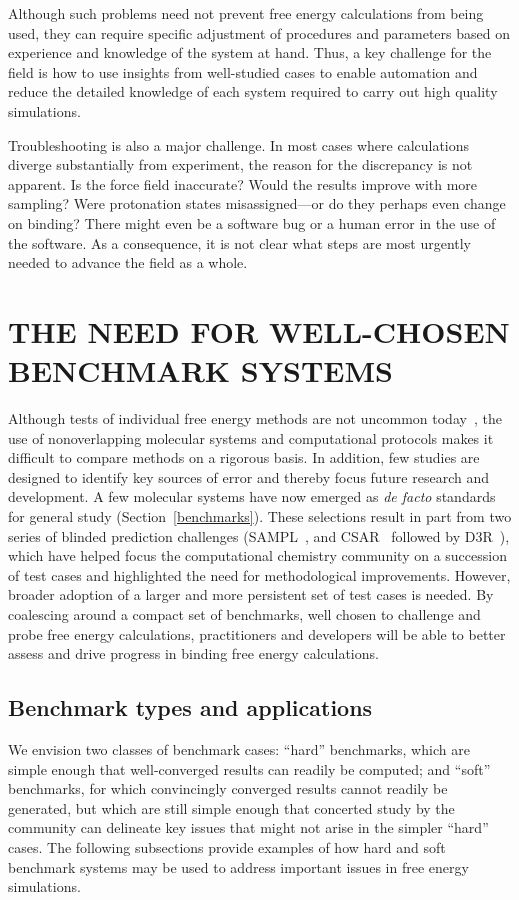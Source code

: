 \documentclass[aps,pre,twocolumn,nofootinbib,superscriptaddress,10pt, final,tightenlines]{revtex4-1}
\begin{document}
Although such problems need not prevent free energy calculations from being used, they can require specific adjustment of procedures and parameters based on experience and knowledge of the system at hand.  
Thus, a key challenge for the field is how to use insights from well-studied cases to enable automation and reduce the detailed knowledge of each system required to carry out high quality simulations. 

Troubleshooting is also a major challenge. 
In most cases where calculations diverge substantially from experiment, the reason for the discrepancy is not apparent. 
Is the force field inaccurate? 
Would the results improve with more sampling?  Were protonation states misassigned---or do they perhaps even change on binding? 
There might even be a software bug \cite{eklund_cluster_2016} or a human error in the use of the software. 
As a consequence, it is not clear what steps are most urgently needed to advance the field as a whole.


\section{THE NEED FOR WELL-CHOSEN BENCHMARK SYSTEMS}

Although tests of individual free energy methods are not uncommon today~\cite{mikulskis_large-scale_2014, schrodinger_accurate_2015, christ_binding_2016, cui_affinity_2016, verras_free_2016}, the use of nonoverlapping molecular systems and computational protocols makes it difficult to compare methods on a rigorous basis.
In addition, few studies are designed to identify key sources of error and thereby focus future research and development.
A few molecular systems have now emerged as \emph{de facto} standards for general study (Section~\ref{benchmarks}). 
These selections result in part from two series of blinded prediction challenges (SAMPL~\cite{muddana_sampl4_2014}, and CSAR~\cite{dunbar_csar_2011} followed by D3R~\cite{gathiaka_d3r_2016}), which have helped focus the computational chemistry community on a succession of test cases and highlighted the need for methodological improvements. 
However, broader adoption of a larger and more persistent set of test cases is needed. 
By coalescing around a compact set of benchmarks, well chosen to challenge and probe free energy calculations, practitioners and developers will be able to better assess and drive progress in binding free energy calculations. 


\subsection{Benchmark types and applications}
\label{subsec:benchmarktypes}
We envision two classes of benchmark cases: ``hard'' benchmarks, which are simple enough that well-converged results can readily be computed; and ``soft'' benchmarks, for which convincingly converged results cannot readily be generated, but which are still simple enough that concerted study by the community can delineate key issues that might not arise in the simpler ``hard'' cases. 
The following subsections provide examples of how hard and soft benchmark systems may be used to address important issues in free energy simulations.
\end{document}
